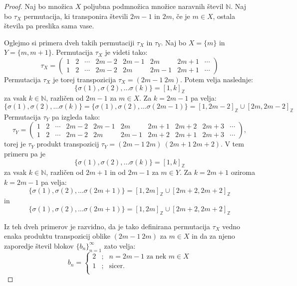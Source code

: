 \documentclass[12pt,a4paper,reqno]{amsart}
\theoremstyle{definition} %
\theoremstyle{plain} %
\newcommand{\N}{\mathbb N}
\newcommand{\Z}{\mathbb Z}
\begin{document}
\begin{proof}
Naj bo množica $X$ poljubna podmnožica množice naravnih števil $\N$. Naj bo $\tau_X$ permutacija, ki transponira števili $2m-1$ in $2m$, če je $m\in X$, ostala števila pa preslika sama vase. %

Oglejmo si  primera dveh takih permutaciji $\tau_X$ in $\tau_Y$. Naj bo $X=\{m\}$ in $Y=\{m,m+1\}$. Permutacija $\tau_X$ je videti tako:
$$\tau_X =
\left(
\begin{array}{cccccccc}
1 & 2 & \cdots & 2m-2 & 2m-1 & 2m & 2m+1 & \cdots \\  
1 & 2 & \cdots & 2m-2 & 2m & 2m-1 & 2m+1 & \cdots
  \end{array}
\right)$$
Permutacija $\tau_X$ je torej transpozicija $\tau_X = (2m-1 \: 2m)$.
Potem velja naslednje:
$$\{ \sigma (1), \sigma (2), \ldots \sigma (k) \} = [1, k]_{\Z}$$
za vsak $k\in \N$, različen od $2m-1$ za $m\in X$. Za $k=2m-1$ pa velja:
$$\{ \sigma (1), \sigma (2), \ldots \sigma (k) \} =\{ \sigma (1), \sigma (2), \ldots \sigma (2m-1) \}= [1, 2m-2]_{\Z} \cup [2m, 2m-2]_{\Z}$$
Permutacija $\tau_Y$ pa izgleda tako:
$$\tau_Y =
\left(
\begin{array}{cccccccccc}
1 & 2 & \cdots & 2m-2 & 2m-1 & 2m & 2m+1 & 2m+2 & 2m+3 & \cdots \\  
1 & 2 & \cdots & 2m-2 & 2m & 2m-1 & 2m+2 & 2m+1 & 2m+3 & \cdots
  \end{array}
\right),$$
torej je $\tau_Y$ produkt transpozicij $\tau_Y=(2m-1 \: 2m)\: (2m+1 \: 2m+2)$.
V tem primeru pa je 
$$\{ \sigma (1), \sigma (2), \ldots \sigma (k) \} = [1, k]_{\Z}$$
za vsak $k\in \N$, različen od $2m+1$ in od $2m-1$ za $m\in Y$. Za $k=2m+1$ oziroma $k=2m-1$ pa velja:
$$\{ \sigma (1), \sigma (2), \ldots \sigma (2m+1) \}= [1, 2m]_{\Z} \cup [2m+2, 2m+2]_{\Z}$$
in 
$$\{ \sigma (1), \sigma (2), \ldots \sigma (2m+1) \}= [1, 2m]_{\Z} \cup [2m+2, 2m+2]_{\Z}$$

Iz teh dveh primerov je razvidno, da je tako definirana permutacija $\tau_X$ vedno enaka produktu transpozicij oblike $(2m-1 \: 2m)$ za $m \in X$ in da za njeno zaporedje števil blokov $\{b_n\}_{n=1}^{\infty}$ zato velja:
$$b_n = 
\left\{ 
\begin{array}{ccc}
2&;&n=2m-1\textrm{ za nek }m \in X\\
1&;&\textrm{sicer.}\\
\end{array}
\right. 
$$


\end{proof}
\end{document}

